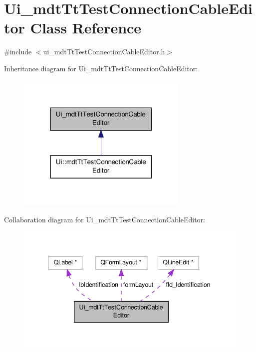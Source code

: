 \hypertarget{class_ui__mdt_tt_test_connection_cable_editor}{\section{Ui\-\_\-mdt\-Tt\-Test\-Connection\-Cable\-Editor Class Reference}
\label{class_ui__mdt_tt_test_connection_cable_editor}
}


{\ttfamily \#include $<$ui\-\_\-mdt\-Tt\-Test\-Connection\-Cable\-Editor.\-h$>$}



Inheritance diagram for Ui\-\_\-mdt\-Tt\-Test\-Connection\-Cable\-Editor\-:\nopagebreak
\begin{figure}[H]
\begin{center}
\leavevmode
\includegraphics[width=232pt]{class_ui__mdt_tt_test_connection_cable_editor__inherit__graph}
\end{center}
\end{figure}


Collaboration diagram for Ui\-\_\-mdt\-Tt\-Test\-Connection\-Cable\-Editor\-:\nopagebreak
\begin{figure}[H]
\begin{center}
\leavevmode
\includegraphics[width=341pt]{class_ui__mdt_tt_test_connection_cable_editor__coll__graph}
\end{center}
\end{figure}
